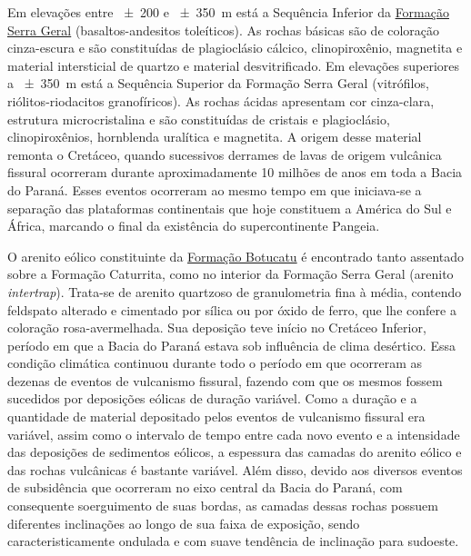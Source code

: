 \def\serrageral{\href{http://pt.wikipedia.org/wiki/Forma\%C3\%A7\%C3\%A3o_Serra_Geral}{Formação Serra Geral}}

Em elevações entre \num{\pm200} e \SI{\pm350}{\metre} está a Sequência Inferior da \serrageral{} 
(basaltos-andesitos toleíticos). As rochas básicas são de coloração cinza-escura e são constituídas de 
plagioclásio cálcico, clinopiroxênio, magnetita e material intersticial de quartzo e material desvitrificado. 
Em elevações superiores a \SI{\pm350}{\metre} está a Sequência Superior da Formação Serra Geral (vitrófilos, 
riólitos-riodacitos granofíricos). As rochas ácidas apresentam cor cinza-clara, estrutura microcristalina e 
são constituídas de cristais e plagioclásio, clinopiroxênios, hornblenda uralítica e magnetita. A origem 
desse material remonta o Cretáceo, quando sucessivos derrames de lavas de origem vulcânica fissural ocorreram 
durante aproximadamente \num{10} milhões de anos em toda a Bacia do Paraná. Esses eventos ocorreram ao mesmo 
tempo em que iniciava-se a separação das plataformas continentais que hoje constituem a América do Sul e 
África, marcando o final da existência do supercontinente Pangeia.

\def\botucatu{\href{http://pt.wikipedia.org/wiki/Forma\%C3\%A7\%C3\%A3o_Botucatu}{Formação Botucatu}}

O arenito eólico constituinte da \botucatu{} é encontrado tanto assentado sobre a Formação Caturrita, como no 
interior da Formação Serra Geral (arenito \emph{intertrap}). Trata-se de arenito quartzoso de granulometria 
fina à média, contendo feldspato alterado e cimentado por sílica ou por óxido de ferro, que lhe confere a 
coloração rosa-avermelhada. Sua deposição teve início no Cretáceo Inferior, período em que a Bacia do Paraná 
estava sob influência de clima desértico. Essa condição climática continuou durante todo o período em que 
ocorreram as dezenas de eventos de vulcanismo fissural, fazendo com que os mesmos fossem sucedidos por 
deposições eólicas de duração variável. Como a duração e a quantidade de material depositado pelos eventos de 
vulcanismo fissural era variável, assim como o intervalo de tempo entre cada novo evento e a intensidade das 
deposições de sedimentos eólicos, a espessura das camadas do arenito eólico e das rochas vulcânicas é bastante 
variável. Além disso, devido aos diversos eventos de subsidência que ocorreram no eixo central da Bacia do 
Paraná, com consequente soerguimento de suas bordas, as camadas dessas rochas possuem diferentes inclinações 
ao longo de sua faixa de exposição, sendo caracteristicamente ondulada e com suave tendência de inclinação 
para sudoeste.

